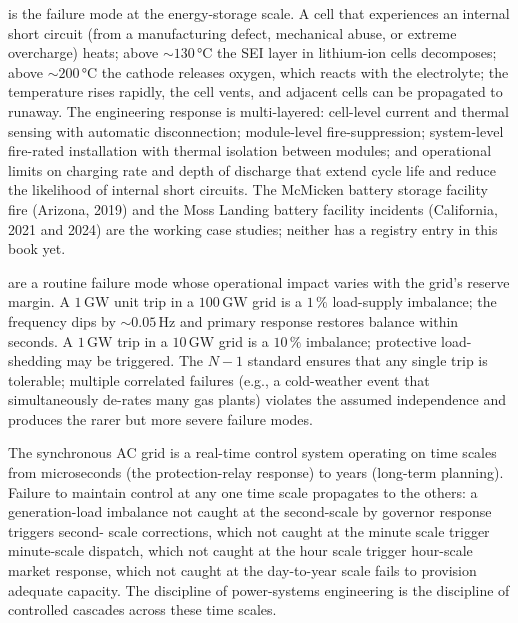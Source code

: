  is the failure
mode at the energy-storage scale. A cell that experiences an
internal short circuit (from a manufacturing defect, mechanical
abuse, or extreme overcharge) heats; above $\sim 130\,\si{\celsius}$
the SEI layer in lithium-ion cells decomposes; above $\sim
200\,\si{\celsius}$ the cathode releases oxygen, which reacts with the
electrolyte; the temperature rises rapidly, the cell vents, and
adjacent cells can be propagated to runaway. The engineering response
is multi-layered: cell-level current and thermal sensing with
automatic disconnection; module-level fire-suppression; system-level
fire-rated installation with thermal isolation between modules; and
operational limits on charging rate and depth of discharge that
extend cycle life and reduce the likelihood of internal short
circuits. The McMicken battery storage facility fire (Arizona, 2019)
and the Moss Landing battery facility incidents (California, 2021
and 2024) are the working case studies; neither has a registry entry
in this book yet.

 are a routine failure mode whose
operational impact varies with the grid's reserve margin. A
$1\,\si{\giga\watt}$ unit trip in a $100\,\si{\giga\watt}$ grid is a
$1\,\%$ load-supply imbalance; the frequency dips by $\sim 0.05\,\si{
\hertz}$ and primary response restores balance within seconds.
A $1\,\si{\giga\watt}$ trip in a $10\,\si{\giga\watt}$ grid is a
$10\,\%$ imbalance; protective load-shedding may be triggered. The
$N-1$ standard ensures that any single trip is tolerable; multiple
correlated failures (e.g., a cold-weather event that simultaneously
de-rates many gas plants) violates the assumed independence and
produces the rarer but more severe failure modes.

\begin{principle}
The synchronous AC grid is a real-time control system operating on
time scales from microseconds (the protection-relay response) to
years (long-term planning). Failure to maintain control at any one
time scale propagates to the others: a generation-load imbalance not
caught at the second-scale by governor response triggers second-
scale corrections, which not caught at the minute scale trigger
minute-scale dispatch, which not caught at the hour scale trigger
hour-scale market response, which not caught at the day-to-year
scale fails to provision adequate capacity. The discipline of
power-systems engineering is the discipline of controlled cascades
across these time scales.
\end{principle}

